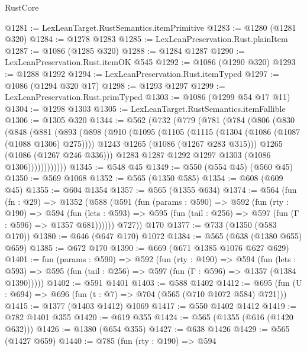 \begin{lexlean}{RustCore}
\begin{coremodule}
@1281 := LexLeanTarget.RustSemantics.itemPrimitive
@1283 := @1280 (@1281 @320)
@1284 := @1278 @1283
@1285 := LexLeanPreservation.Rust.plainItem
@1287 := @1086 (@1285 @320)
@1288 := @1284 @1287
@1290 := LexLeanPreservation.Rust.itemOK @545
@1292 := @1086 (@1290 @320)
@1293 := @1288 @1292
@1294 := LexLeanPreservation.Rust.itemTyped
@1297 := @1086 (@1294 @320 @17)
@1298 := @1293 @1297
@1299 := LexLeanPreservation.Rust.primTyped
@1303 := @1086 (@1299 @54 @17 @11)
@1304 := @1298 @1303
@1305 := LexLeanTarget.RustSemantics.itemFallible
@1306 := @1305 @320
@1344 := @562
    (@732
      (@779
        (@781
          (@784
            (@806
              (@830
                (@848
                  (@881
                    (@893
                      (@898
                        (@910
                          (@1095
                            (@1105
                              (@1115 (@1304 (@1086 (@1087 (@1088 @1306) @275))))
                              @1243
                              @1265
                              (@1086 (@1267 @283 @315)))
                            @1265
                            (@1086 (@1267 @246 @336)))
                          @1283
                          @1287
                          @1292
                          @1297
                          @1303
                          (@1086 @1306))))))))))))
@1345 := @548 @45
@1349 := @550 (@554 @45) (@560 @45)
@1350 := @569 @1068
@1352 := @565 (@1350 @585)
@1354 := @608 (@609 @45)
@1355 := @604 @1354
@1357 := @565 (@1355 @634)
@1374 := @564
    (fun (fn : @29) =>
    @1352
      (@588
        (@591
          (fun (params : @590) =>
          @592
            (fun (rty : @190) =>
            @594
              (fun (lets : @593) =>
              @595 (fun (tail : @256) => @597 (fun (Γ : @596) => @1357 @681))))))
        @727))
    @170
@1377 := @733 (@1350 (@583 @170))
@1380 := @646 (@647 @170) @1072
@1384 := @565 (@638 (@1380 @655) @659)
@1385 := @672 @170
@1390 := @669 (@671 @1385 @1076 @627 @629)
@1401 := fun (params : @590) =>
  @592
    (fun (rty : @190) =>
    @594
      (fun (lets : @593) =>
      @595 (fun (tail : @256) => @597 (fun (Γ : @596) => @1357 (@1384 @1390)))))
@1402 := @591 @1401
@1403 := @588 @1402
@1412 := @695 (fun (U : @694) => @696 (fun (t : @7) => @704 (@565 (@710 @1072 @584) @721)))
@1415 := @1377 (@1403 @1412) @1069
@1417 := @550 @1402 @1412
@1419 := @782 @1401 @355
@1420 := @619 @355
@1424 := @565 (@1355 (@616 (@1420 @632)))
@1426 := @1380 (@654 @355)
@1427 := @638 @1426
@1429 := @565 (@1427 @659)
@1440 := @785
    (fun (rty : @190) =>
    @594

\end{coremodule}
\end{lexlean}
